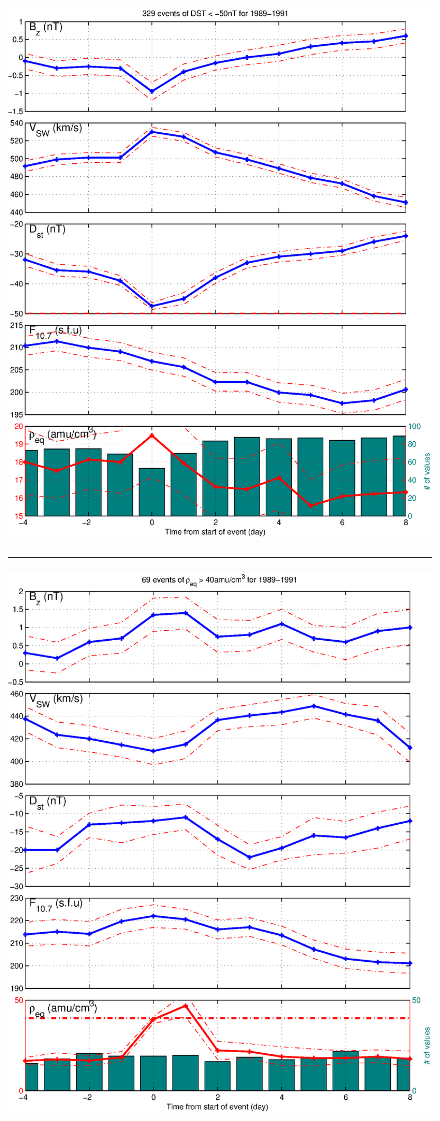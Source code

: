 \documentclass[10pt,twocolumn]{article}
\begin{document}
\begin{figure}[tp!]
\centering
\includegraphics[scale=0.40]{paperfigures/stormavs-dst-50-tak.eps}
\rule[1ex]{5cm}{1pt}
\includegraphics[scale=0.40]{paperfigures/stormavs-mass-tak.eps}

\end{figure}
\end{document}
